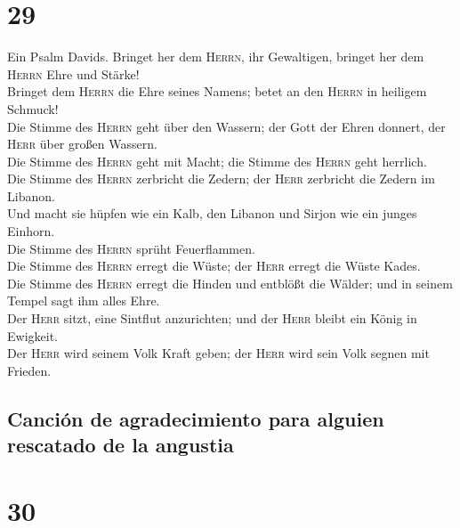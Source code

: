 \hypertarget{section-28}{%
\section{29}\label{section-28}}

 Ein Psalm Davids. Bringet her dem \textsc{Herrn}, ihr
Gewaltigen, bringet her dem \textsc{Herrn} Ehre und Stärke!\\
 Bringet dem \textsc{Herrn} die Ehre seines Namens; betet
an den \textsc{Herrn} in heiligem Schmuck!\\
 Die Stimme des \textsc{Herrn} geht über den Wassern; der
Gott der Ehren donnert, der \textsc{Herr} über großen Wassern.\\
 Die Stimme des \textsc{Herrn} geht mit Macht; die Stimme
des \textsc{Herrn} geht herrlich.\\
 Die Stimme des \textsc{Herrn} zerbricht die Zedern; der
\textsc{Herr} zerbricht die Zedern im Libanon.\\
 Und macht sie hüpfen wie ein Kalb, den Libanon und Sirjon
wie ein junges Einhorn.\\
 Die Stimme des \textsc{Herrn} sprüht Feuerflammen.\\
 Die Stimme des \textsc{Herrn} erregt die Wüste; der
\textsc{Herr} erregt die Wüste Kades.\\
 Die Stimme des \textsc{Herrn} erregt die Hinden und
entblößt die Wälder; und in seinem Tempel sagt ihm alles Ehre.\\
 Der \textsc{Herr} sitzt, eine Sintflut anzurichten; und
der \textsc{Herr} bleibt ein König in Ewigkeit.\\
 Der \textsc{Herr} wird seinem Volk Kraft geben; der
\textsc{Herr} wird sein Volk segnen mit Frieden.

\hypertarget{canciuxf3n-de-agradecimiento-para-alguien-rescatado-de-la-angustia}{%
\subsection{Canción de agradecimiento para alguien rescatado de la
angustia}\label{canciuxf3n-de-agradecimiento-para-alguien-rescatado-de-la-angustia}}

\hypertarget{section-29}{%
\section{30}\label{section-29}}

